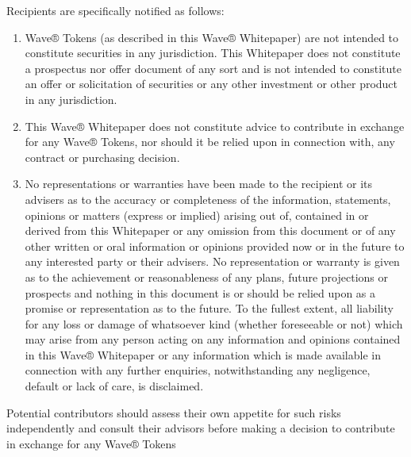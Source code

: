 \documentclass[letterpaper,10pt,english]{sphinxmanual}
\begin{document}
Recipients are specifically notified as follows:
\begin{enumerate}
\def\theenumi{\arabic{enumi}}
\def\labelenumi{\theenumi .}
\makeatletter\def\p@enumii{\p@enumi \theenumi .}\makeatother
\item {} 
 Wave® Tokens (as described in this Wave® Whitepaper) are not intended to constitute securities in any jurisdiction. This Whitepaper does not constitute a prospectus nor offer document of any sort and is not intended to constitute an offer or solicitation of securities or any other investment or other product in any jurisdiction.

\item {} 
 This Wave® Whitepaper does not constitute advice to contribute in exchange for any Wave® Tokens, nor should it be relied upon in connection with, any contract or purchasing decision.

\item {} 
 No representations or warranties have been made to the recipient or its advisers as to the accuracy or completeness of the information, statements, opinions or matters (express or implied) arising out of, contained in or derived from this Whitepaper or any omission from this document or of any other written or oral information or opinions provided now or in the future to any interested party or their advisers. No representation or warranty is given as to the achievement or reasonableness of any plans, future projections or prospects and nothing in this document is or should be relied upon as a promise or representation as to the future. To the fullest extent, all liability for any loss or damage of whatsoever kind (whether foreseeable or not) which may arise from any person acting on any information and opinions contained in this Wave® Whitepaper or any information which is made available in connection with any further enquiries, notwithstanding any negligence, default or lack of care, is disclaimed.

\end{enumerate}

 Potential contributors should assess their own appetite for such risks independently and consult their advisors before making a decision to contribute in exchange for any Wave® Tokens



\renewcommand{\indexname}{Index}
\printindex
\end{document}
